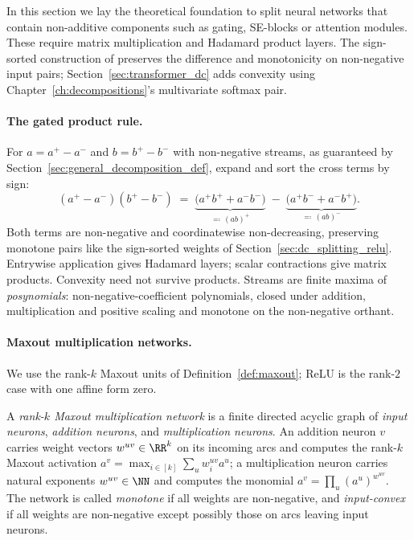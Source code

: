 In this section we lay the theoretical foundation to split neural networks that contain non-additive components such as gating, SE-blocks or attention modules. These require matrix multiplication and Hadamard product layers. The sign-sorted construction of \textcite{hiddenMono} preserves the difference and monotonicity on non-negative input pairs; Section~\ref{sec:transformer_dc} adds convexity using Chapter~\ref{ch:decompositions}'s multivariate softmax pair.

\paragraph{The gated product rule.}
For $a = a^{+} - a^{-}$ and $b = b^{+} - b^{-}$ with non-negative streams, as guaranteed by Section~\ref{sec:general_decomposition_def}, expand and sort the cross terms by sign:
\begin{equation}
	(a^{+} - a^{-})(b^{+} - b^{-})
	\;=\;
	\underbrace{\bigl(a^{+}b^{+} + a^{-}b^{-}\bigr)}_{\eqqcolon\, (ab)^{+}}
	\;-\;
	\underbrace{\bigl(a^{+}b^{-} + a^{-}b^{+}\bigr)}_{\eqqcolon\, (ab)^{-}}.
	\label{eq:pair_product_rule}
\end{equation}
Both terms are non-negative and coordinatewise non-decreasing, preserving monotone pairs like the sign-sorted weights of Section~\ref{sec:dc_splitting_relu}. Entrywise application gives Hadamard layers; scalar contractions give matrix products. Convexity need not survive products. Streams are finite maxima of \emph{posynomials}: non-negative-coefficient polynomials, closed under addition, multiplication and positive scaling and monotone on the non-negative orthant.

\paragraph{Maxout multiplication networks.}
We use the rank-$k$ Maxout units of Definition~\ref{def:maxout}; ReLU is the rank-$2$ case with one affine form zero.

\begin{definition}\label{def:maxout_multiplication_network}
A \emph{rank-$k$ Maxout multiplication network} is a finite directed acyclic graph of \emph{input neurons}, \emph{addition neurons}, and \emph{multiplication neurons}. An addition neuron $v$ carries weight vectors $w^{uv} \in \RR^k$ on its incoming arcs and computes the rank-$k$ Maxout activation $a^v = \max_{i \in [k]} \sum_{u} w^{uv}_i a^u$; a multiplication neuron carries natural exponents $w^{uv} \in \NN$ and computes the monomial $a^v = \prod_{u} (a^u)^{w^{uv}}$. The network is called \emph{monotone} if all weights are non-negative, and \emph{input-convex} if all weights are non-negative except possibly those on arcs leaving input neurons.
\end{definition}

